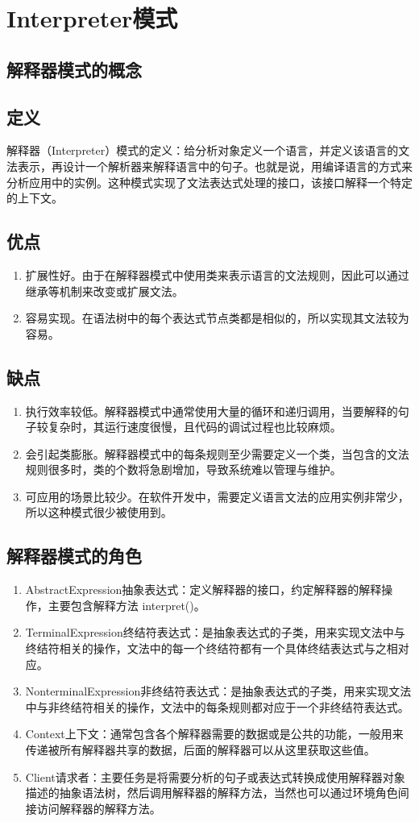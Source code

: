 \chapter{Interpreter模式}
\section{解释器模式的概念}
\section{定义}
解释器（Interpreter）模式的定义：给分析对象定义一个语言，并定义该语言的文法表示，再设计一个解析器来解释语言中的句子。也就是说，用编译语言的方式来分析应用中的实例。这种模式实现了文法表达式处理的接口，该接口解释一个特定的上下文。
\section{优点}
\begin{enumerate}
	\item 扩展性好。由于在解释器模式中使用类来表示语言的文法规则，因此可以通过继承等机制来改变或扩展文法。
	\item 容易实现。在语法树中的每个表达式节点类都是相似的，所以实现其文法较为容易。
\end{enumerate}
\section{缺点}
\begin{enumerate}
	\item 执行效率较低。解释器模式中通常使用大量的循环和递归调用，当要解释的句子较复杂时，其运行速度很慢，且代码的调试过程也比较麻烦。
	\item 会引起类膨胀。解释器模式中的每条规则至少需要定义一个类，当包含的文法规则很多时，类的个数将急剧增加，导致系统难以管理与维护。
	\item 可应用的场景比较少。在软件开发中，需要定义语言文法的应用实例非常少，所以这种模式很少被使用到。
\end{enumerate}
\section{解释器模式的角色}
\begin{enumerate}
	\item AbstractExpression抽象表达式：定义解释器的接口，约定解释器的解释操作，主要包含解释方法 interpret()。
	\item TerminalExpression终结符表达式：是抽象表达式的子类，用来实现文法中与终结符相关的操作，文法中的每一个终结符都有一个具体终结表达式与之相对应。
	\item NonterminalExpression非终结符表达式：是抽象表达式的子类，用来实现文法中与非终结符相关的操作，文法中的每条规则都对应于一个非终结符表达式。
	\item Context上下文：通常包含各个解释器需要的数据或是公共的功能，一般用来传递被所有解释器共享的数据，后面的解释器可以从这里获取这些值。
	\item Client请求者：主要任务是将需要分析的句子或表达式转换成使用解释器对象描述的抽象语法树，然后调用解释器的解释方法，当然也可以通过环境角色间接访问解释器的解释方法。
\end{enumerate}
